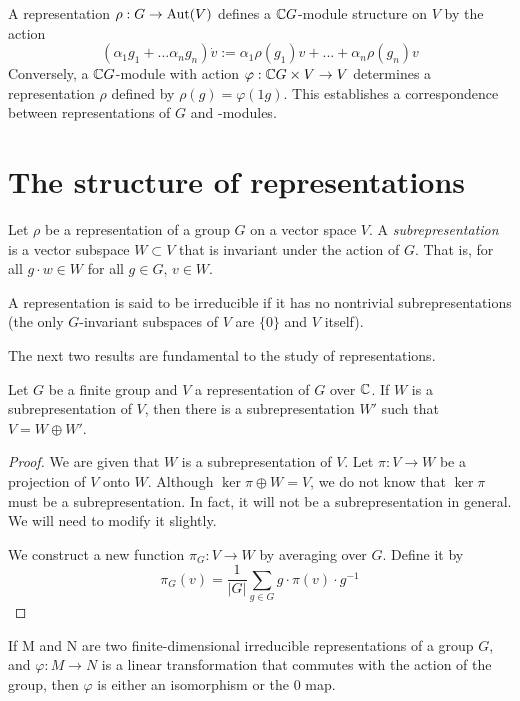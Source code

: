 A representation $\rho : G \rightarrow \operatorname{Aut}(V)$ defines a $\mathbb{C} G$-module structure on $V$ by the action
\[
    (\alpha_1g_1 + ... \alpha_ng_n) \dot v := \alpha_1\rho(g_1)v + ...+ \alpha_n\rho(g_n)v
\]
Conversely, a $\mathbb{C} G$-module with action $\varphi : \mathbb{C} G \times V \rightarrow V$ determines a representation $\rho$ 
defined by $\rho(g) = \varphi(1g)$. This establishes a correspondence between representations of $G$ and 
\CG-modules.


\section{The structure of representations}


\begin{definition}
    Let $\rho$ be a representation of a group $G$ on a vector space $V$. A \emph{subrepresentation} is a vector 
    subspace $W \subset V$ that is invariant under the action of $G$. That is, for all $g\cdot w \in W$ for all $g 
    \in G$, $v \in W$. 
    
    A representation is said to be irreducible if it has no nontrivial subrepresentations (the only $G$-invariant 
    subspaces of $V$ are $\{ 0 \}$ and $V$ itself).
\end{definition}


The next two results are fundamental to the study of representations.


\begin{theorem}
    Let $G$ be a finite group and $V$ a representation of $G$ over $\mathbb{C}$. If $W$ is a subrepresentation of $V$, then 
there is a subrepresentation $W'$ such that $V = W \oplus W'$.  \end{theorem}


\begin{proof}
    We are given that $W$ is a subrepresentation of $V$. Let $\pi : V \rightarrow W$ be a projection of $V$ onto 
    $W$. Although $\ker \pi \oplus W = V$, we do not know that $\ker \pi$ must be a subrepresentation. In fact, it 
    will not be a subrepresentation in general. We will need to modify it slightly.

    We construct a new function $\pi_G : V \rightarrow W$ by averaging over $G$. Define it by
    \[
        \pi_G(v) = \frac{1}{|G|}\sum_{g \in G} g \cdot \pi(v) \cdot g^{-1}
    \]
\end{proof}


\begin{theorem}
    If M and N are two finite-dimensional irreducible representations of a group $G$, and $\varphi:M \to N$ is a 
    linear transformation that commutes with the action of the group, then $\varphi$ is either an isomorphism or 
    the $0$ map.
\end{theorem}

